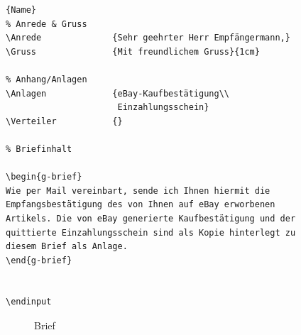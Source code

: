 \begin{lstlisting}[caption=Briefinhalt,
                   label={lst:simplelist}]{Name}
% Anrede & Gruss
\Anrede              {Sehr geehrter Herr Empfängermann,}
\Gruss               {Mit freundlichem Gruss}{1cm}

% Anhang/Anlagen
\Anlagen             {eBay-Kaufbestätigung\\
                      Einzahlungsschein}
\Verteiler           {}

% Briefinhalt

\begin{g-brief}
Wie per Mail vereinbart, sende ich Ihnen hiermit die
Empfangsbestätigung des von Ihnen auf eBay erworbenen
Artikels. Die von eBay generierte Kaufbestätigung und der
quittierte Einzahlungsschein sind als Kopie hinterlegt zu
diesem Brief als Anlage.
\end{g-brief}


\endinput                 
\end{lstlisting}

\begin{figure}[htbp]
    \centering
{}
    \caption{Brief}
    \label{pic:inderbar}
\end{figure}